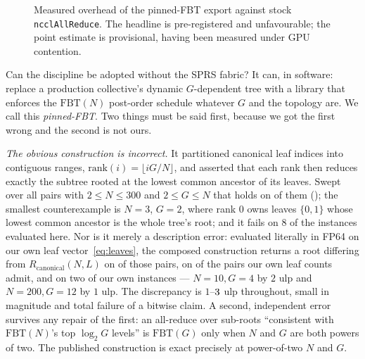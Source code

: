 \documentclass[journal,10pt]{IEEEtran}
\theoremstyle{plain}
\theoremstyle{definition}
\theoremstyle{remark}
\newcommand{\FBT}{\ensuremath{\mathrm{FBT}}}
\newcommand{\Rcan}{\ensuremath{R_{\mathrm{canonical}}}}
\newcommand{\sprs}{\textsc{SPRS}}
\begin{document}
\begin{figure}[!t]\centering

\caption{Measured overhead of the pinned-FBT export against stock \texttt{ncclAllReduce}. The headline is pre-registered and unfavourable; the point estimate is provisional, having been measured under GPU contention.}\label{fig:exportcost}
\end{figure}


Can the discipline be adopted without the \sprs{} fabric? It can, in software:
replace a production collective's dynamic $G$-dependent tree with a library
that enforces the $\FBT(N)$ post-order schedule whatever $G$ and the topology
are. We call this \emph{pinned-FBT}. Two things must be said first, because we
got the first wrong and the second is not ours.

\emph{The obvious construction is incorrect.} It partitioned canonical
leaf indices into contiguous ranges, $\mathrm{rank}(i) = \lfloor iG/N \rfloor$,
and asserted that each rank then reduces exactly the subtree rooted at the
lowest common ancestor of its leaves. Swept over all \SweepPairs{} pairs with
$2 \le N \le 300$ and $2 \le G \le N$ that holds on \SweepStepOneHolds{} of
them (\SweepStepOnePct{}); the smallest counterexample is $N=3$, $G=2$, where
rank $0$ owns leaves $\{0,1\}$ whose lowest common ancestor is the whole
tree's root; and it fails on $8$ of the \SuiteSize{} instances evaluated here.
Nor is it merely a description error: evaluated literally in FP64 on our own
leaf vector~\eqref{eq:leaves}, the composed construction returns a root
differing from $\Rcan(N,L)$ on \PinIrMismatch{} of those pairs, on
\SweepRootDivergePct{} of the \PinSuitePairs{} pairs our own leaf counts
admit, and on two of our own instances --- $N=10, G=4$ by $2$ ulp and
$N=200, G=12$ by $1$ ulp. The discrepancy is $1$--$3{}$ ulp
throughout, small in magnitude and total failure of a bitwise claim. A second,
independent error survives any repair of the first: an all-reduce over
sub-roots ``consistent with $\FBT(N)$'s top $\log_2 G$ levels'' is $\FBT(G)$
only when $N$ and $G$ are both powers of two. The published construction is
exact precisely at power-of-two $N$ and $G$.
\end{document}

